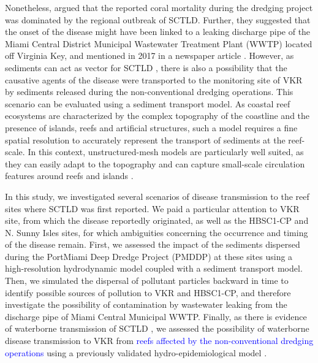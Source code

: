 \documentclass[preprint,12pt,authoryear]{elsarticle}
\newcommand{\modif}[1]{\textcolor{blue}{#1}}
\begin{document}
Nonetheless, \cite{gintert2019regional} argued that the reported coral mortality during the dredging project was dominated by the regional outbreak of SCTLD. Further, they suggested that the onset of the disease might have been linked to a leaking discharge pipe of the Miami Central District Municipal Wastewater Treatment Plant (WWTP) located off Virginia Key, and mentioned in 2017 in a newspaper article \citep{staletovich2017}. However, as sediments can act as vector for SCTLD \citep{studivan2022reef}, there is also a possibility that the causative agents of the disease were transported to the monitoring site of VKR by sediments released during the non-conventional dredging operations. This scenario can be evaluated using a sediment transport model. As coastal reef ecosystems are characterized by the complex topography of the coastline and the presence of islands, reefs and artificial structures, such a model requires a fine spatial resolution to accurately represent the transport of sediments at the reef-scale. In this context, unstructured-mesh models are particularly well suited, as they can easily adapt to the topography \citep{fringer2019future} and can capture small-scale circulation features around reefs and islands \citep{lambrechts2008multi}.

In this study, we investigated several scenarios of disease transmission to the reef sites where SCTLD was first reported. We paid a particular attention to VKR site, from which the disease reportedly originated, as well as the HBSC1-CP and N. Sunny Isles sites, for which ambiguities concerning the occurrence and timing of the disease remain. First, we assessed the impact of the sediments dispersed during the PortMiami Deep Dredge Project (PMDDP) at these sites using a high-resolution hydrodynamic model coupled with a sediment transport model. Then, we simulated the dispersal of pollutant particles backward in time to identify possible sources of pollution to VKR and HBSC1-CP, and therefore investigate the possibility of contamination by wastewater leaking from the discharge pipe of Miami Central Municipal WWTP. Finally, as there is evidence of waterborne transmission of SCTLD \citep{aeby2019pathogenesis,eaton2021measuring, meiling2021variable}, we assessed the possibility of waterborne disease transmission to VKR from \modif{reefs affected by the non-conventional dredging operations} using a previously validated hydro-epidemiological model \citep{dobbelaere2022connecting}.
\end{document}
